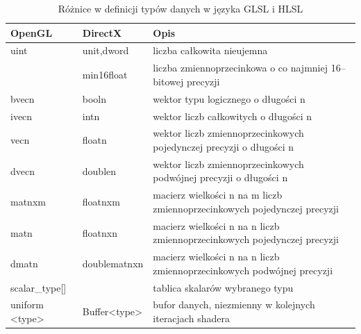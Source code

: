 \documentclass[archive]{mgr}
\begin{document}
\begin{table}[!h]

    \centering 
    \caption{Różnice w definicji typów danych w języka GLSL i HLSL}
    		\label{lab:datatypes}
    \vspace{2mm} 
\begin{tabular}{|p{3cm}|p{3cm}|p{9cm}|}
\hline


\textbf{OpenGL}&\textbf{DirectX}&\textbf{Opis}\\ \hline
uint & unit,dword& liczba całkowita nieujemna\\ \hline
       & min16float& liczba zmiennoprzecinkowa o co najmniej 16–bitowej precyzji\\ \hline
bvecn & booln& wektor typu logicznego o długości n\\ \hline
ivecn & intn&wektor liczb całkowitych o długości n\\ \hline
vecn & floatn&wektor liczb zmiennoprzecinkowych pojedynczej precyzji o długości n\\ \hline
dvecn & doublen&wektor liczb zmiennoprzecinkowych podwójnej precyzji o długości n\\ \hline
matnxm & floatnxm& macierz wielkości n na m liczb zmiennoprzecinkowych pojedynczej precyzji\\ \hline
matn & floatnxn& macierz wielkości n na n liczb zmiennoprzecinkowych pojedynczej precyzji\\ \hline
dmatn & doublematnxn& macierz wielkości n na n liczb zmiennoprzecinkowych podwójnej precyzji\\ \hline
scalar\_type[] & & tablica skalarów wybranego typu\\ \hline
uniform <type> & Buffer<type>& bufor danych, niezmienny w kolejnych iteracjach shadera\\ \hline

\end{tabular}
\end{table}

\newpage
\end{document}
